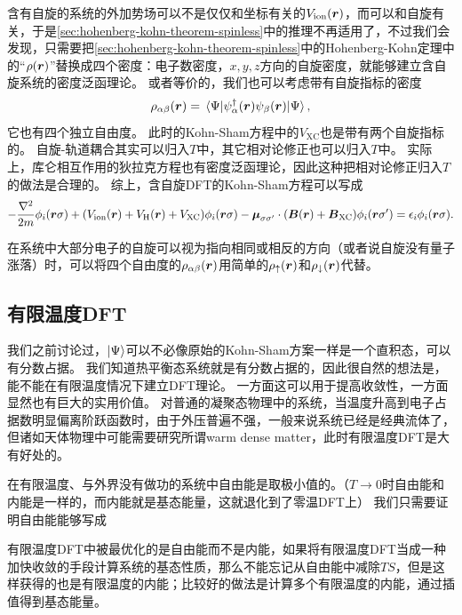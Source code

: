 含有自旋的系统的外加势场可以不是仅仅和坐标有关的$V_\text{ion}(\vb*{r})$，而可以和自旋有关，于是\autoref{sec:hohenberg-kohn-theorem-spinless}中的推理不再适用了，不过我们会发现，只需要把\autoref{sec:hohenberg-kohn-theorem-spinless}中的Hohenberg-Kohn定理中的“$\rho(\vb*{r})$”替换成四个密度：电子数密度，$x, y, z$方向的自旋密度，就能够建立含自旋系统的密度泛函理论。
或者等价的，我们也可以考虑带有自旋指标的密度
\begin{equation}
    \rho_{\alpha \beta}(\vb*{r}) = \expval{\psi^\dagger_\alpha(\vb*{r}) \psi_\beta(\vb*{r})}{\Psi},
\end{equation}
它也有四个独立自由度。
此时的Kohn-Sham方程中的$V_\text{XC}$也是带有两个自旋指标的。
自旋-轨道耦合其实可以归入$T$中，其它相对论修正也可以归入$T$中。
实际上，库仑相互作用的狄拉克方程也有密度泛函理论，因此这种把相对论修正归入$T$的做法是合理的。
综上，含自旋DFT的Kohn-Sham方程可以写成
\begin{equation}
    - \frac{\laplacian}{2m} \phi_i(\vb*{r} \sigma) + (V_\text{ion}(\vb*{r}) + V_\text{H}(\vb*{r}) + V_\text{XC}) \phi_i(\vb*{r} \sigma) - \vb*{\mu}_{\sigma \sigma'} \cdot (\vb*{B}(\vb*{r}) + \vb*{B}_\text{XC}) \phi_i(\vb*{r} \sigma') = \epsilon_i \phi_i(\vb*{r} \sigma).
\end{equation}

在系统中大部分电子的自旋可以视为指向相同或相反的方向（或者说自旋没有量子涨落）时，可以将四个自由度的$\rho_{\alpha \beta}(\vb*{r})$用简单的$\rho_\uparrow(\vb*{r})$和$\rho_\downarrow(\vb*{r})$代替。

\subsection{有限温度DFT}

我们之前讨论过，$\ket{\Psi}$可以不必像原始的Kohn-Sham方案一样是一个直积态，可以有分数占据。
我们知道热平衡态系统就是有分数占据的，因此很自然的想法是，能不能在有限温度情况下建立DFT理论。
一方面这可以用于提高收敛性，一方面显然也有巨大的实用价值。
对普通的凝聚态物理中的系统，当温度升高到电子占据数明显偏离阶跃函数时，由于外压普遍不强，一般来说系统已经是经典流体了，但诸如天体物理中可能需要研究所谓warm dense matter，此时有限温度DFT是大有好处的。

在有限温度、与外界没有做功的系统中自由能是取极小值的。（$T \to 0$时自由能和内能是一样的，而内能就是基态能量，这就退化到了零温DFT上）
我们只需要证明自由能能够写成


有限温度DFT中被最优化的是自由能而不是内能，如果将有限温度DFT当成一种加快收敛的手段计算系统的基态性质，那么不能忘记从自由能中减除$TS$，但是这样获得的也是有限温度的内能；比较好的做法是计算多个有限温度的内能，通过插值得到基态能量。

